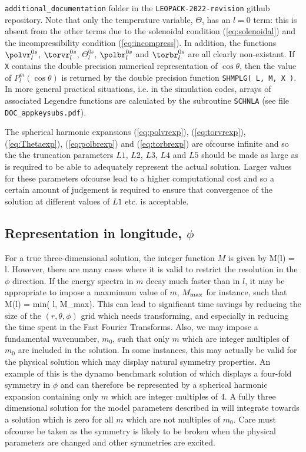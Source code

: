 \verb+additional_documentation+ folder in the
\verb+LEOPACK-2022-revision+ github repository.
Note that only the temperature
variable, $\Theta$, has an $l=0$ term: this is absent from
the other terms due to the solenoidal condition
(\ref{eq:solenoidal}) and the incompressibility 
condition (\ref{eq:incompress}).
In addition, the functions $\polvr^{0s}_l$, $\torvr^{0s}_l$,
$\Theta^{0s}_l$, $\polbr^{0s}_l$ and $\torbr^{0s}_l$ are
all clearly non-existant.
If \verb+X+ contains the double precision numerical
representation of $\cos \theta$, then the value of
$P_l^m ( \cos \theta )$ is returned by the double
precision function \verb+SHMPLG( L, M, X )+.
In more general practical situations, i.e. in the simulation
codes, arrays of associated Legendre functions are calculated
by the subroutine \verb+SCHNLA+
(see file \verb+DOC_appkeysubs.pdf+).


The spherical harmonic expansions (\ref{eq:polvrexp}),
 (\ref{eq:torvrexp}),
 (\ref{eq:Thetaexp}),
 (\ref{eq:polbrexp}) and (\ref{eq:torbrexp}) are ofcourse
infinite and so the the truncation parameters
$L1$, $L2$, $L3$, $L4$ and $L5$ should be made as large
as is required to be able to adequately represent the
actual solution. Larger values for these parameters
ofcourse lead to a higher computational cost and so
a certain amount of judgement is required to ensure
that convergence of the solution at different values
of $L1$ etc. is acceptable.

\subsection{Representation in longitude, $\phi$}

For a true three-dimensional solution,
the integer function $M$ is given by
\beq
M(l) = l.
\eeq
However, there are many cases where it is valid to
restrict the resolution in the $\phi$ direction.
If the energy spectra in $m$ decay much faster than
in $l$, it may be appropriate to impose a maxmimum
value of $m$, $M_{\rm max}$ for instance, such that
\beq
M(l) = min( l, M_{\rm max}).
\label{eq:mlmmaxdef}
\eeq
This can lead to significant time savings by reducing
the size of the $(r, \theta, \phi)$ grid which needs
transforming, and especially in reducing the time
spent in the Fast Fourier Transforms.
Also, we may impose a fundamental wavenumber, $m_0$,
such that only $m$ which are integer multiples of
$m_0$ are included in the solution. In some instances,
this may actually be valid for the physical solution
which may display natural symmetry properties. An
example of this is the dynamo benchmark solution of
\cite{bench} which displays a four-fold symmetry in
$\phi$ and can therefore be represented by a
spherical harmonic expansion containing only $m$ which
are integer multiples of $4$. A fully three dimensional
solution for the model parameters described in
\cite{bench} will integrate towards a solution which is
zero for all $m$ which are not multiples of $m_0$.
Care must ofcourse be taken as the symmetry is likely to
be broken when the physical parameters are changed
and other symmetries are excited.


